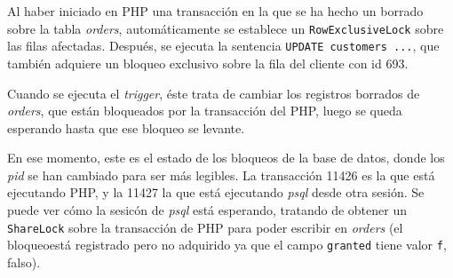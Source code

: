\documentclass{article}
\begin{document}
Al haber iniciado en PHP una transacción en la que se ha hecho un borrado sobre la tabla \textit{orders}, automáticamente se establece un \texttt{RowExclusiveLock} sobre las filas afectadas. Después, se ejecuta la sentencia \texttt{UPDATE customers ...}, que también adquiere un bloqueo exclusivo sobre la fila del cliente con id 693.

Cuando se ejecuta el \textit{trigger}, éste trata de cambiar los registros borrados de \textit{orders}, que están bloqueados por la transacción del PHP, luego se queda esperando hasta que ese bloqueo se levante.

En ese momento, este es el estado de los bloqueos de la base de datos, donde los \textit{pid} se han cambiado para ser más legibles. La transacción 11426 es la que está ejecutando PHP, y la 11427 la que está ejecutando \textit{psql} desde otra sesión. Se puede ver cómo la sesicón de \textit{psql} está esperando, tratando de obtener un \texttt{ShareLock} sobre la transacción de PHP para poder escribir en \textit{orders} (el bloqueoestá registrado pero no adquirido ya que el campo \texttt{granted} tiene valor \texttt{f}, falso).
\end{document}
